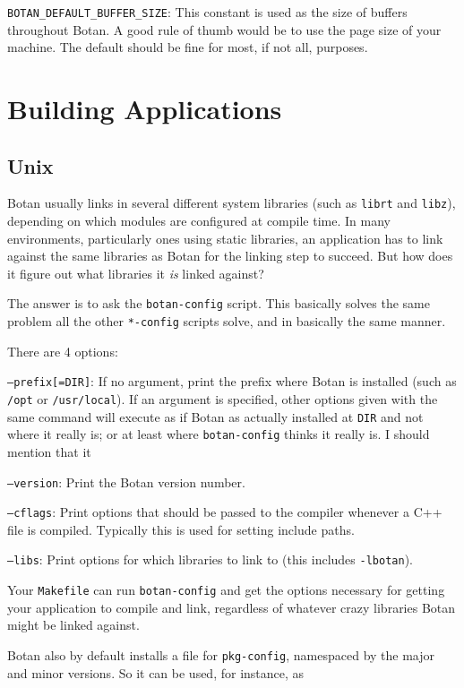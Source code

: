 \documentclass{article}
\newcommand{\filename}[1]{\texttt{#1}}
\newcommand{\macro}[1]{\texttt{#1}}
\begin{document}
\macro{BOTAN\_DEFAULT\_BUFFER\_SIZE}: This constant is used as the size of
buffers throughout Botan. A good rule of thumb would be to use the page size of
your machine. The default should be fine for most, if not all, purposes.

\section{Building Applications}

\subsection{Unix}

Botan usually links in several different system libraries (such as
\texttt{librt} and \texttt{libz}), depending on which modules are
configured at compile time. In many environments, particularly ones
using static libraries, an application has to link against the same
libraries as Botan for the linking step to succeed. But how does it
figure out what libraries it \emph{is} linked against?

The answer is to ask the \filename{botan-config} script. This
basically solves the same problem all the other \filename{*-config}
scripts solve, and in basically the same manner.

There are 4 options:

\texttt{--prefix[=DIR]}: If no argument, print the prefix where Botan
is installed (such as \filename{/opt} or \filename{/usr/local}). If an
argument is specified, other options given with the same command will
execute as if Botan as actually installed at \filename{DIR} and not
where it really is; or at least where \filename{botan-config} thinks
it really is. I should mention that it

\texttt{--version}: Print the Botan version number.

\texttt{--cflags}: Print options that should be passed to the compiler
whenever a C++ file is compiled. Typically this is used for setting
include paths.

\texttt{--libs}: Print options for which libraries to link to (this includes
\texttt{-lbotan}).

Your \filename{Makefile} can run \filename{botan-config} and get the
options necessary for getting your application to compile and link,
regardless of whatever crazy libraries Botan might be linked against.

Botan also by default installs a file for \texttt{pkg-config},
namespaced by the major and minor versions. So it can be used,
for instance, as
\end{document}
